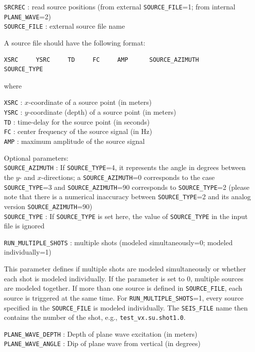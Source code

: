 \texttt{SRCREC} : read source positions (from external \texttt{SOURCE\_FILE}=1; from internal \texttt{PLANE\_WAVE}=2)\\
\texttt{SOURCE\_FILE} : external source file name

A source file should have the following format:
\begin{verbatim}
XSRC     YSRC     TD     FC     AMP      SOURCE_AZIMUTH     SOURCE_TYPE
\end{verbatim}

where

\texttt{XSRC} : $x$-coordinate of a source point (in meters)\\
\texttt{YSRC} : $y$-coordinate (depth) of a source point (in meters)\\
\texttt{TD} : time-delay for the source point (in seconds)\\
\texttt{FC} : center frequency of the source signal (in Hz)\\
\texttt{AMP} : maximum amplitude of the source signal

Optional parameters:\\
\texttt{SOURCE\_AZIMUTH} : If \texttt{SOURCE\_TYPE}=4, it represents the angle in degrees between the $y$- and $x$-directions; a \texttt{SOURCE\_AZIMUTH}=0 corresponds to the case \texttt{SOURCE\_TYPE}=3 and \texttt{SOURCE\_AZIMUTH}=90 corresponds to \texttt{SOURCE\_TYPE}=2 (please note that there is a numerical inaccuracy between \texttt{SOURCE\_TYPE}=2 and its analog version \texttt{SOURCE\_AZIMUTH}=90)\\
\texttt{SOURCE\_TYPE} : If \texttt{SOURCE\_TYPE} is set here, the value of \texttt{SOURCE\_TYPE} in the input file is ignored

\texttt{RUN\_MULTIPLE\_SHOTS} : multiple shots (modeled simultaneously=0; modeled individually=1)

This parameter defines if multiple shots are modeled simultaneously or whether each shot is modeled individually. If the parameter is set to 0, multiple sources are modeled together. If more than one source is defined in \texttt{SOURCE\_FILE}, each source is triggered at the same time. For \texttt{RUN\_MULTIPLE\_SHOTS}=1, every source specified in the \texttt{SOURCE\_FILE} is modeled individually. The \texttt{SEIS\_FILE} name then contains the number of the shot, e.g., \texttt{test\_vx.su.shot1.0}.

\texttt{PLANE\_WAVE\_DEPTH} : Depth of plane wave excitation (in meters)\\
\texttt{PLANE\_WAVE\_ANGLE} : Dip of plane wave from vertical (in degrees)

